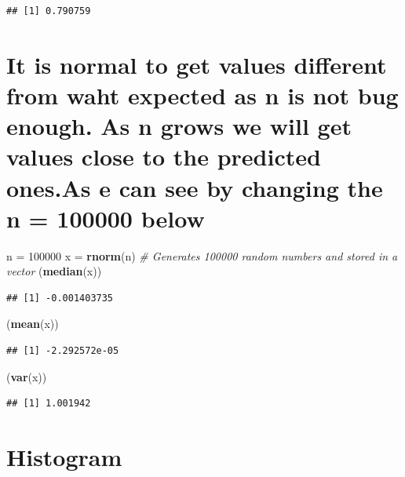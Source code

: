 \documentclass[]{article}
\newenvironment{Shaded}{\begin{snugshade}}{\end{snugshade}}
\newcommand{\KeywordTok}[1]{\textcolor[rgb]{0.13,0.29,0.53}{\textbf{#1}}}
\newcommand{\DecValTok}[1]{\textcolor[rgb]{0.00,0.00,0.81}{#1}}
\newcommand{\StringTok}[1]{\textcolor[rgb]{0.31,0.60,0.02}{#1}}
\newcommand{\CommentTok}[1]{\textcolor[rgb]{0.56,0.35,0.01}{\textit{#1}}}
\newcommand{\NormalTok}[1]{#1}
\begin{document}
\begin{verbatim}
## [1] 0.790759
\end{verbatim}

\section{It is normal to get values different from waht expected as n is
not bug enough. As n grows we will get values close to the predicted
ones.As e can see by changing the n = 100000
below}\label{it-is-normal-to-get-values-different-from-waht-expected-as-n-is-not-bug-enough.-as-n-grows-we-will-get-values-close-to-the-predicted-ones.as-e-can-see-by-changing-the-n-100000-below}

\begin{Shaded}
\begin{Highlighting}[]
\NormalTok{n =}\StringTok{ }\DecValTok{100000}
\NormalTok{x =}\StringTok{ }\KeywordTok{rnorm}\NormalTok{(n) }\CommentTok{# Generates 100000 random numbers and stored in a vector}
\NormalTok{(}\KeywordTok{median}\NormalTok{(x))}
\end{Highlighting}
\end{Shaded}

\begin{verbatim}
## [1] -0.001403735
\end{verbatim}

\begin{Shaded}
\begin{Highlighting}[]
\NormalTok{(}\KeywordTok{mean}\NormalTok{(x))}
\end{Highlighting}
\end{Shaded}

\begin{verbatim}
## [1] -2.292572e-05
\end{verbatim}

\begin{Shaded}
\begin{Highlighting}[]
\NormalTok{(}\KeywordTok{var}\NormalTok{(x))}
\end{Highlighting}
\end{Shaded}

\begin{verbatim}
## [1] 1.001942
\end{verbatim}

\section{Histogram}\label{histogram}
\end{document}
